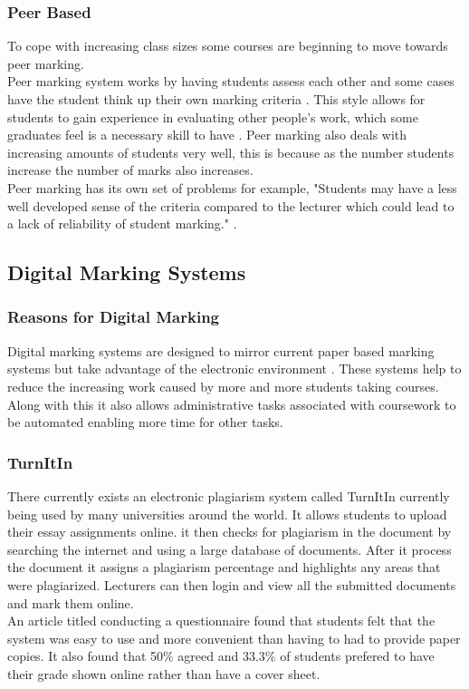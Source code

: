 \documentclass[12pt]{article}  %
\begin{document}
\subsubsection{Peer Based}
To cope with increasing class sizes some courses are beginning to move towards peer marking.\\
Peer marking system works by having students assess each other and some cases have the student think up their own marking criteria \cite{orsmond_use_2000}. This style allows for students to gain experience in evaluating other people's work, which some graduates feel is a necessary skill to have \cite{langan_insights_????}. Peer marking also deals with increasing amounts of students very well, this is because as the number students increase the number of marks also increases.  \\
Peer marking has its own set of problems for example, "Students may have a less well developed sense of the criteria compared to the lecturer which could lead to a lack of reliability of student marking." \cite{orsmond_use_2000}. \\


\newpage
\subsection{Digital Marking Systems}

\subsubsection{Reasons for Digital Marking}
Digital marking systems are designed to mirror current paper based marking systems but take advantage of the electronic environment \cite{heinrich_online_2003}. These systems help to reduce the increasing work caused by more and more students taking courses. Along with this it also allows administrative tasks associated with coursework to be automated enabling more time for other tasks.\cite{joy_effective_1998} 

\subsubsection{TurnItIn}
There currently exists an electronic plagiarism system called TurnItIn \cite{_turnitin_????} currently being used by many universities around the world. It allows students to upload their essay assignments online. it then checks for plagiarism in the document by searching the internet and using a large database of documents. After it process the document it assigns a plagiarism percentage and highlights any areas that were plagiarized. Lecturers can then login and view all the submitted documents and mark them online.\\
An article titled  \cite{dahl_turnitin_2007} conducting a questionnaire found that students felt that the system was easy to use and more convenient than having to had to provide paper copies. It also found that 50\% agreed and 33.3\% of students prefered to have their grade shown online rather than have a cover sheet.
\end{document}
